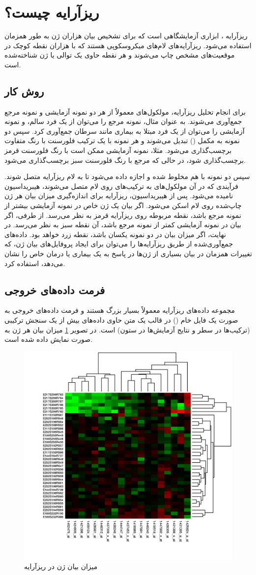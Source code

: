 \documentclass{article}
\begin{document}
\section{ریزآرایه چیست؟}
ریزآرایه ، ابزاری آزمایشگاهی است که برای تشخیص بیان هزاران ژن به طور همزمان استفاده می‌شود. ریزآرایه‌های  لام‌های میکروسکوپی هستند که با هزاران نقطه کوچک در موقعیت‌های مشخص چاپ می‌شوند و هر نقطه حاوی یک توالی  یا ژن شناخته‌شده است.

 \subsection*{روش کار}
برای انجام تحلیل ریزآرایه، مولکول‌های  معمولاً از هر دو نمونه آزمایشی و نمونه مرجع جمع‌آوری می‌شوند. به عنوان مثال، نمونه مرجع را می‌توان از یک فرد سالم، و نمونه آزمایشی را می‌توان از یک فرد مبتلا به بیماری مانند سرطان جمع‌آوری کرد. سپس دو نمونه  به  مکمل () تبدیل می‌شوند و هر نمونه با یک ترکیب فلورسنت  با رنگ متفاوت برچسب‌گذاری می‌شود. مثلا، نمونه آزمایشی  ممکن است با رنگ فلورسنت قرمز برچسب‌گذاری شود، در حالی که  مرجع با رنگ فلورسنت سبز برچسب‌گذاری می‌شود.

 سپس دو نمونه با هم مخلوط شده و اجازه داده می‌شود تا به لام ریزآرایه متصل شوند. فرآیندی که در آن مولکول‌های  به ترکیب‌های  روی لام متصل می‌شوند، هیبریداسیون  نامیده می‌شود.
پس از هیبریداسیون، ریزآرایه برای اندازه‌گیری میزان بیان هر ژن چاپ‌شده روی لام اسکن می‌شود. اگر بیان یک ژن خاص در نمونه آزمایشی بیشتر از نمونه مرجع باشد، نقطه مربوطه روی ریزآرایه قرمز به نظر می‌رسد.
از طرفی، اگر بیان در نمونه آزمایشی کمتر از نمونه مرجع باشد، آن نقطه سبز به نظر می‌رسد. در نهایت، اگر میزان بیان در دو نمونه یکسان باشد، نقطه زرد خواهد بود. داده‌های جمع‌آوری‌شده از طریق ریزآرایه‌ها را می‌توان برای ایجاد پروفایل‌های بیان ژن، که تغییرات همزمان در بیان بسیاری از ژن‌ها در پاسخ به یک بیماری یا درمان خاص را نشان می‌دهد، استفاده کرد. \cite{nature-microarray}
 
 \subsection*{فرمت داده‌‌های خروجی}
مجموعه داده‌های ریزآرایه معمولاً بسیار بزرگ هستند و فرمت داده‌های خروجی به صورت یک فایل خام () در قالب یک متن  حاوی داده‌های بیش از یک سنجش ترکیبی (ترکیب‌ها در سطر‌ و نتایج آزمایش‌ها در ستون) است.
در تصویر \ref{fig:microarray} میزان بیان هر ژن به صورت  نمایش داده شده است.
\begin{figure}[h!]
	\centering
	\includegraphics[width=0.3\columnwidth]{figs/microarray.png}
	\caption{میزان بیان ژن در ریزآرایه \cite{wiki-microarray}}
	\label{fig:microarray}
\end{figure}
\end{document}
